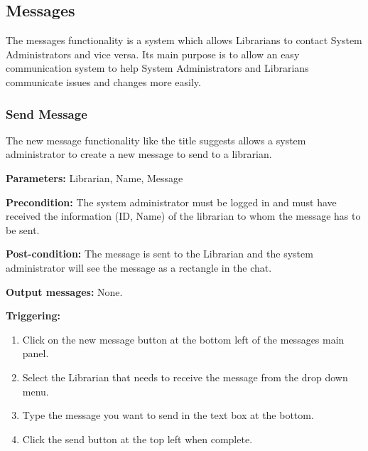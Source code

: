 \documentclass{article}
\begin{document}
\subsection{Messages}

The messages functionality is a system which allows Librarians to contact System
Administrators and vice versa. Its main purpose is to allow an easy communication system to help System Administrators and Librarians communicate issues and changes more easily.

\subsubsection{Send Message}

The new message functionality like the title suggests allows a system administrator to create a new message to send to a librarian. 

\begin{description}

\item \textbf{Parameters:} Librarian, Name, Message

\item \textbf{Precondition:} The system administrator must be logged in and must
have received the information (ID, Name) of the librarian to whom the message
has to be sent.

\item \textbf{Post-condition:} The message is sent to the Librarian and the
system administrator will see the message as a rectangle in the chat.

\item \textbf{Output messages:} None.

\item \textbf{Triggering:}
\begin{enumerate}

\item Click on the new message button at the bottom left of the messages main panel. 

\item Select the Librarian that needs to receive the message from the drop down menu.

\item Type the message you want to send in the text box at the bottom. 

\item Click the send button at the top left when complete.  

\end{enumerate}

\end{description}
\end{document}
